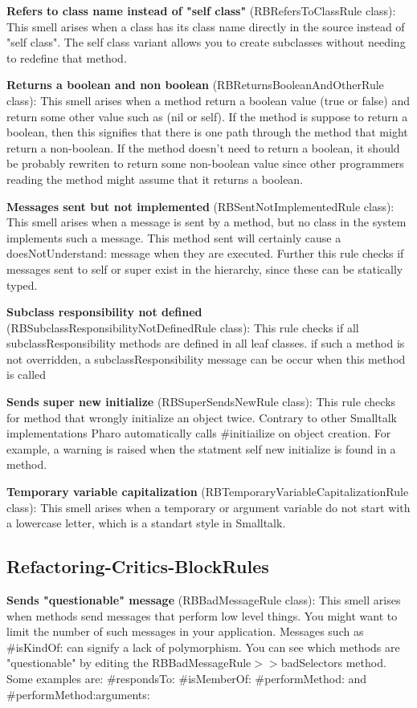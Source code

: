 \textbf{Refers to class name instead of "self class"} (RBRefersToClassRule class): This smell arises when a class has its class name directly in the source instead of "self class". The self class variant allows you to create subclasses without needing to redefine that method.

\textbf{Returns a boolean and non boolean} (RBReturnsBooleanAndOtherRule class): This smell arises when a method return a boolean value (true or false) and return some other value such as (nil or self). If the method is suppose to return a boolean, then this signifies that there is one path through the method that might return a non-boolean. If the method doesn't need to return a boolean, it should be probably rewriten to return some non-boolean value since other programmers reading the method might assume that it returns a boolean.

\textbf{Messages sent but not implemented} (RBSentNotImplementedRule class): This smell arises when a message is sent by a method,  but no class in the system implements such a message. This method sent will certainly cause a doesNotUnderstand: message when they are executed.  Further this rule checks if messages sent to self or super exist in the hierarchy, since these can be statically typed.

\textbf{Subclass responsibility not defined} (RBSubclassResponsibilityNotDefinedRule class): This rule checks if all subclassResponsibility methods are defined in all leaf classes. if such a method is not overridden, a subclassResponsibility message can be occur when this method is called

\textbf{Sends super new initialize} (RBSuperSendsNewRule class):  This rule checks for method that wrongly initialize an object twice. Contrary to other Smalltalk implementations Pharo automatically calls \#initiailize on object creation.
For example, a warning is raised when the statment self new initialize is found in a method.

\textbf{Temporary variable capitalization} (RBTemporaryVariableCapitalizationRule class): This smell arises when a temporary or argument variable do not start with a lowercase letter, which is a standart style in Smalltalk.

\subsection{Refactoring-Critics-BlockRules}
\textbf{Sends "questionable" message} (RBBadMessageRule class): This smell arises when methods send messages that perform low level things. You might want to limit the number of such messages in your application. Messages such as \#isKindOf: can signify a lack of polymorphism. You can see which methods are "questionable" by editing the RBBadMessageRule$>>$badSelectors method. Some examples are: \#respondsTo: \#isMemberOf: \#performMethod: and \#performMethod:arguments:


